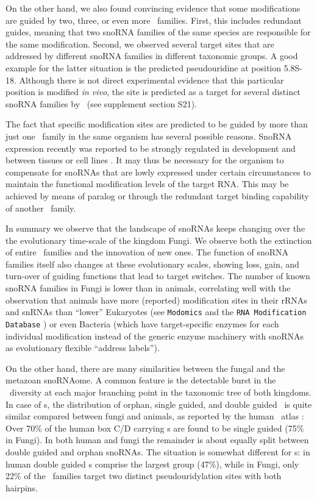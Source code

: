 On the other hand, we also found convincing evidence that some
modifications are guided by two, three, or even more \sno\
families. First, this includes redundant guides, meaning that two
snoRNA families of the same species are responsible for the same
modification. Second, we observed several target sites that are
addressed by different snoRNA families in different taxonomic
groups. A good example for the latter situation is the predicted
pseudouridine at position 5.8S-18. Although there is not direct
experimental evidence that this particular position is modified
\emph{in vivo}, the site is predicted as a target for several distinct
snoRNA families by \snoop\ (see supplement section S21).

The fact that specific modification sites are predicted to be guided
by more than just one \sno\ family in the same organism has several
possible reasons. SnoRNA expression recently was reported to be
strongly regulated in development and between tissues or cell lines
\cite{Kapushesky:2012, Jorjani:2016}. It may thus be necessary for the
organism to compensate for snoRNAs that are lowly expressed under
certain circumstances to maintain the functional modification levels
of the target RNA. This may be achieved by means of paralog or through
the redundant target binding capability of another \sno\ family.

In summary we observe that the landscape of snoRNAs keeps changing
over the the evolutionary time-scale of the kingdom Fungi. We observe
both the extinction of entire \sno\ families and the innovation of new
ones. The function of snoRNA families itself also changes at these
evolutionary scales, showing loss, gain, and turn-over of guiding
functions that lead to target switches. The number of known snoRNA
families in Fungi is lower than in animals, correlating well with the
observation that animals have more (reported) modification sites in
their rRNAs and snRNAs than ``lower'' Eukaryotes (see
\texttt{Modomics} and the \texttt{RNA Modification Database}
\cite{Machnicka:2013, Cantara:2011}) or even Bacteria (which have
target-specific enzymes for each individual modification instead of
the generic enzyme machinery with snoRNAs as evolutionary flexible
``address labels'').

On the other hand, there are many similarities between the fungal and
the metazoan snoRNAome.  A common feature is the detectable burst in
the \sno\ diversity at each major branching point in the taxonomic
tree of both kingdoms.  In case of \cd s, the distribution of orphan,
single guided, and double guided \snos\ is quite similar compared
between fungi and animals, as reported by the human \sno\ atlas
\citep{Jorjani:2016}: Over 70\% of the human box C/D carrying \sno s
are found to be single guided (75\% in Fungi).  In both human and
fungi the remainder is about equally split between double guided and
orphan snoRNAs. The situation is somewhat different for \haca s: in
human double guided \sno s comprise the largest group (47\%), while in
Fungi, only 22\% of the \haca\ families target two distinct
pseudouridylation sites with both hairpins.

